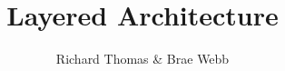 \documentclass{csse4400}
\title{Layered Architecture}
\author{Richard Thomas \& Brae Webb}
\date{\week{1}}
\begin{document}
\makecover





\end{document}
